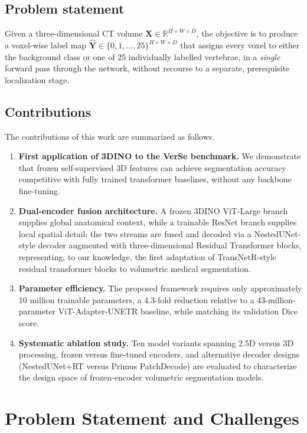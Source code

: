 \documentclass[preprint,12pt,3p]{elsarticle}
\begin{document}
\subsection{Problem statement}
Given a three-dimensional CT volume $\mathbf{X} \in \mathbb{R}^{H \times W \times D}$, the objective is to produce a voxel-wise label map $\hat{\mathbf{Y}} \in \{0, 1, \ldots, 25\}^{H \times W \times D}$ that assigns every voxel to either the background class or one of 25 individually labelled vertebrae, in a \emph{single} forward pass through the network, without recourse to a separate, prerequisite localization stage.

\subsection{Contributions}
The contributions of this work are summarized as follows.
\begin{enumerate}[leftmargin=1.4em,itemsep=2pt,topsep=3pt]
  \item \textbf{First application of 3DINO to the VerSe benchmark.} We demonstrate that frozen self-supervised 3D features can achieve segmentation accuracy competitive with fully trained transformer baselines, without any backbone fine-tuning.
  \item \textbf{Dual-encoder fusion architecture.} A frozen 3DINO ViT-Large branch supplies global anatomical context, while a trainable ResNet branch supplies local spatial detail; the two streams are fused and decoded via a NestedUNet-style decoder augmented with three-dimensional Residual Transformer blocks, representing, to our knowledge, the first adaptation of TransNetR-style residual transformer blocks to volumetric medical segmentation.
  \item \textbf{Parameter efficiency.} The proposed framework requires only approximately 10 million trainable parameters, a 4.3-fold reduction relative to a 43-million-parameter ViT-Adapter-UNETR baseline, while matching its validation Dice score.
  \item \textbf{Systematic ablation study.} Ten model variants spanning 2.5D versus 3D processing, frozen versus fine-tuned encoders, and alternative decoder designs (NestedUNet+RT versus Primus PatchDecode) are evaluated to characterize the design space of frozen-encoder volumetric segmentation models.
\end{enumerate}

\section{Problem Statement and Challenges}
\label{sec:problem}
\end{document}
